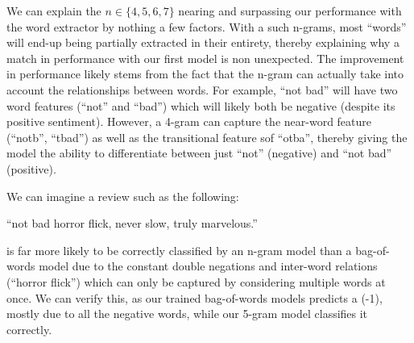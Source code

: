 \documentclass[12pt]{article}
\begin{document}
\begin{enumerate}[label=(\alph*)]
  We can explain the $n \in \{4,5,6,7\}$ nearing and surpassing our performance with the word extractor by nothing a few factors. With a such n-grams, most ``words'' will end-up being partially extracted in their entirety, thereby explaining why a match in performance with our first model is non unexpected. The improvement in performance likely stems from the fact that the n-gram can actually take into account the relationships between words. For example, ``not bad'' will have two word features (``not'' and ``bad'') which will likely both be negative (despite its positive sentiment). However, a 4-gram can capture the near-word feature (``notb'', ``tbad'') as well as the transitional feature sof ``otba'', thereby giving the model the ability to differentiate between just ``not'' (negative) and ``not bad'' (positive).

  We can imagine a review such as the following:

  ``not bad horror flick, never slow, truly marvelous.''
  
  is far more likely to be correctly classified by an n-gram model than a bag-of-words model due to the constant double negations and inter-word relations (``horror flick'') which can only be captured by considering multiple words at once. We can verify this, as our trained bag-of-words models predicts a (-1), mostly due to all the negative words, while our 5-gram model classifies it correctly.


\end{enumerate}
\end{document}
